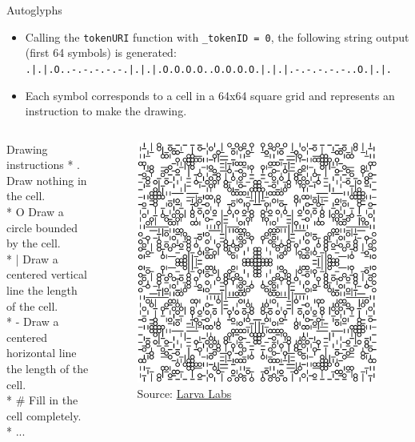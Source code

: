 \documentclass[handout]{beamer}
\begin{document}
\begin{frame}{Autoglyphs}
	\begin{itemize}
		\item Calling the \texttt{tokenURI} function with \texttt{\_tokenID = 0}, the following string output (first 64 symbols) is generated: {\scriptsize \texttt{.|.|.O..-.-.-.-.-.|.|.|.O.O.O.O..O.O.O.O.|.|.|.-.-.-.-.-..O.|.|.}}
		\item Each symbol corresponds to a cell in a 64x64 square grid and represents an instruction to make the drawing.
	\end{itemize}
	\begin{columns}
			\begin{samplecode}{Drawing instructions}
 				* 	.  Draw nothing in the cell.\\
 				* 	O  Draw a circle bounded by the cell.\\
				*   |  Draw a centered vertical line the length of the cell.\\
 				*   -  Draw a centered horizontal line the length of the cell.\\
 				*   \#  Fill in the cell completely. \\
 				* ...
			\end{samplecode}
			\begin{figure}
				\center
				\vspace{-0.5em}
				\includegraphics[scale=0.2]{../assets/images/glyph1.png}
				\caption*{Source: \link \href{https://larvalabs.com/autoglyphs/glyph?index=1}{Larva Labs}}	
			\end{figure}
	\end{columns}
\end{frame}
\end{document}
